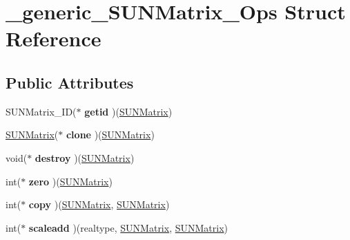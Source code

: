 \hypertarget{struct__generic__SUNMatrix__Ops}{}\section{\+\_\+generic\+\_\+\+S\+U\+N\+Matrix\+\_\+\+Ops Struct Reference}
\label{struct__generic__SUNMatrix__Ops}
\subsection*{Public Attributes}
\begin{DoxyCompactItemize}
\item 
\mbox{\label{struct__generic__SUNMatrix__Ops_aca4be4fd5eb09e8cb052e7e55f14237d}} 
S\+U\+N\+Matrix\+\_\+\+ID($\ast$ {\bfseries getid} )(\mbox{\hyperlink{struct__generic__SUNMatrix}{S\+U\+N\+Matrix}})
\item 
\mbox{\label{struct__generic__SUNMatrix__Ops_a153a71fefac89223cfda1f6c77a7820a}} 
\mbox{\hyperlink{struct__generic__SUNMatrix}{S\+U\+N\+Matrix}}($\ast$ {\bfseries clone} )(\mbox{\hyperlink{struct__generic__SUNMatrix}{S\+U\+N\+Matrix}})
\item 
\mbox{\label{struct__generic__SUNMatrix__Ops_a170a615ae225082b5422a77a4dddec96}} 
void($\ast$ {\bfseries destroy} )(\mbox{\hyperlink{struct__generic__SUNMatrix}{S\+U\+N\+Matrix}})
\item 
\mbox{\label{struct__generic__SUNMatrix__Ops_ac488b19a4b97ee1c89c7289e6c677381}} 
int($\ast$ {\bfseries zero} )(\mbox{\hyperlink{struct__generic__SUNMatrix}{S\+U\+N\+Matrix}})
\item 
\mbox{\label{struct__generic__SUNMatrix__Ops_aedfc246ce25d48d18860de9b293057e9}} 
int($\ast$ {\bfseries copy} )(\mbox{\hyperlink{struct__generic__SUNMatrix}{S\+U\+N\+Matrix}}, \mbox{\hyperlink{struct__generic__SUNMatrix}{S\+U\+N\+Matrix}})
\item 
\mbox{\label{struct__generic__SUNMatrix__Ops_af2d38d8737452f90523c20577c91122b}} 
int($\ast$ {\bfseries scaleadd} )(realtype, \mbox{\hyperlink{struct__generic__SUNMatrix}{S\+U\+N\+Matrix}}, \mbox{\hyperlink{struct__generic__SUNMatrix}{S\+U\+N\+Matrix}})

\end{DoxyCompactItemize}
